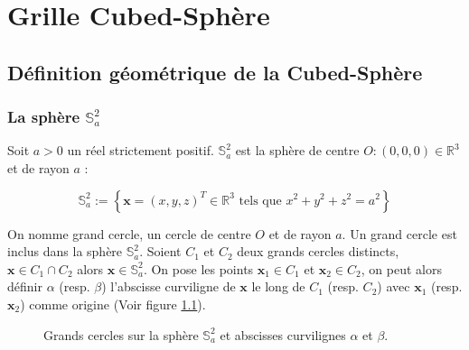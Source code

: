 
\chapter{Grille Cubed-Sphère}

\section{Définition géométrique de la Cubed-Sphère}

\subsection{La sphère $\mathbb{S}_a^2$}

Soit $a > 0$ un réel strictement positif. $\mathbb{S}_a^2$ est la sphère de centre $O : (0,0,0) \in \mathbb{R}^3$ et de rayon $a$ :

\begin{equation}
\mathbb{S}_a^2 := \left\lbrace
\mathbf{x} = (x,y,z)^T \in \mathbb{R}^3 \text{ tels que } x^2+y^2+z^2 = a^2
\right\rbrace
\end{equation} 

On nomme grand cercle, un cercle de centre $O$ et de rayon $a$. Un grand cercle est inclus dans la sphère $\mathbb{S}_a^2$.
Soient $C_1$ et $C_2$ deux grands cercles distincts, $\mathbf{x} \in C_1 \cap C_2$ alors $\mathbf{x} \in \mathbb{S}_a^2$.
On pose les points $\mathbf{x}_1 \in C_1$ et $\mathbf{x}_2 \in C_2$, on peut alors définir $\alpha$ (resp. $\beta$) l’abscisse curviligne de $\mathbf{x}$ le long de $C_1$ (resp. $C_2$) avec $\mathbf{x}_1$ (resp. $\mathbf{x}_2$) comme origine (Voir figure \ref{fig: grands cercles}).


\begin{figure}[ht]
\begin{center}
\end{center}
\caption{Grands cercles sur la sphère $\mathbb{S}_a^2$ et abscisses curvilignes $\alpha$ et $\beta$.}
\label{fig: grands cercles}
\end{figure}

